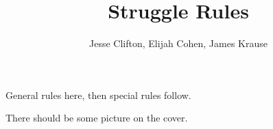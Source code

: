 \documentclass{article}
\title{Struggle Rules}
\author{Jesse Clifton, Elijah Cohen, James Krause}
\begin{document}
\maketitle

\newpage

General rules here, then special rules follow.

There should be some picture on the cover.

\newpage

\
\

\newpage

\newpage

\
\

\
\

\newpage

\newpage

\newpage

\end{document}
